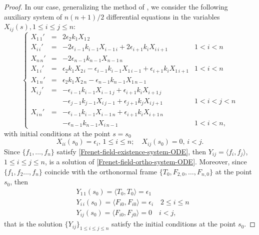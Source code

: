\documentclass[11pt]{amsart}
\theoremstyle{plain}
\theoremstyle{definition}
\numberwithin{equation}{section}
\begin{document}
\begin{proof}
In our case,  generalizing the method of \cite{MR3198740}, we consider the following auxiliary system of ${n(n+1)}/{2}$ differential equations in the variables $X_{ij}(s), 1 \leq i \leq j \leq n$:
{\small \begin{equation}\label{Frenet-field-ortho-system-ODE}
\left \{
\begin{array}{ccll}
X_{1 \, 1}' &= &2\epsilon_2 k_1 X_{1 \,2}&\\[1 ex]
X_{i \, i}' & = & -2\epsilon_{i-1} k_{i-1} X_{i-1 \, i} + 2\epsilon_{i+1} k_i X_{i \, i+1} & 1 < i < n\\[1 ex]
X_{n \, n}' & = & -2\epsilon_{n-1} k_{n-1} X_{n-1 \,n}&\\[1 ex]
X_{1 \, i}' &= & \epsilon_2 k_1 X_{2 \, i} - \epsilon_{i-1} k_{i-1} X_{1 \, i-1} + \epsilon_{i+1} k_i X_{1 \, i+1} & 1 < i < n\\[1 ex]
X_{1 \, n}'  &=&  \epsilon_2 k_1 X_{2 \, n} - \epsilon_{n-1} k_{n-1} X_{1 \, n-1}&\\[1 ex]
X_{i \, j}'  &=&  - \epsilon_{i-1} k_{i-1} X_{i-1 \, j} + \epsilon_{i+1} k_i X_{i+1 \, j}&\\
&& - \epsilon_{j-1} k_{j-1} X_{i \, j-1} + \epsilon_{j+1} k_j X_{i \, j + 1} &1 < i < j < n\\[1 ex]
X_{i \, n}' &=&  - \epsilon_{i-1} k_{i-1} X_{i-1 \, n} + \epsilon_{i+1} k_i X_{i+1 \, n} &\\[1 ex]
&&- \epsilon_{n-1} k_{n-1} X_{i \, n - 1} & 1 < i < n,
\end{array} \right .
\end{equation}
}
with initial conditions at the point $s=s_0$
\[
X_{ii}(s_0) = \epsilon_i, \, 1 \leq i \leq n; \quad X_{ij}(s_0) = 0, \, i < j.
\]
Since $\{ f_1, \dots, f_n\}$ satisfy \eqref{Frenet-field-existence-system-ODE}, then  $Y_{ij} = \langle f_i, f_j \rangle$, $1 \leq i \leq j \leq n$, is a solution of \eqref{Frenet-field-ortho-system-ODE}. Moreover, since $\{f_1, f_2 \dots, f_n\}$  coincide with the orthonormal frame $\{ T_0, F_{2,0},\ldots,F_{n,0} \}$ at the point $s_0$, then
\[
\begin{aligned}
&Y_{1 \, 1}(s_0) = \langle T_0, T_0 \rangle = \epsilon_1\\
&Y_{i \, i}(s_0) = \langle F_{i0}, F_{i0} \rangle = \epsilon_i \quad 2 \leq i \leq n\\
&Y_{ij}(s_0) = \langle F_{i0}, F_{j0} \rangle = 0 \quad  i < j,
\end{aligned}
\]
that is the solution $\lbrace Y_{ij} \rbrace_{1 \leq i \leq j \leq n}$ satisfy the initial conditions at the point $s_0$.

\end{proof}
\end{document}
